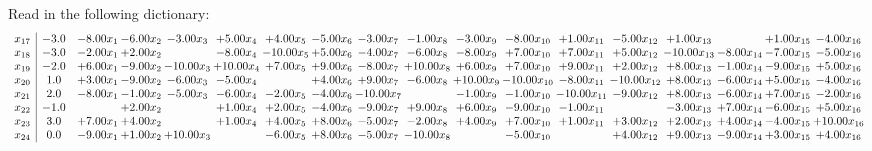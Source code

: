 \documentclass[9pt]{article}
\begin{document}
Read in the following dictionary:
\[\begin{array}{c| c c@{\hskip 2pt} c@{\hskip 2pt} c@{\hskip 2pt} c@{\hskip 2pt} c@{\hskip 2pt} c@{\hskip 2pt} c@{\hskip 2pt} c@{\hskip 2pt} c@{\hskip 2pt} c@{\hskip 2pt} c@{\hskip 2pt} c@{\hskip 2pt} c@{\hskip 2pt} c@{\hskip 2pt} c@{\hskip 2pt} c@{\hskip 2pt} }
 x_{17}   &  -3.0 & -8.00 x_{1} & -6.00 x_{2} & -3.00 x_{3} & +  5.00 x_{4} & +  4.00 x_{5} & -5.00 x_{6} & -3.00 x_{7} & -1.00 x_{8} & -3.00 x_{9} & -8.00 x_{10} & +  1.00 x_{11} & -5.00 x_{12} & +  1.00 x_{13} &   & +  1.00 x_{15} & -4.00 x_{16}\\
 x_{18}   &  -3.0 & -2.00 x_{1} & +  2.00 x_{2} &   & -8.00 x_{4} & -10.00 x_{5} & +  5.00 x_{6} & -4.00 x_{7} & -6.00 x_{8} & -8.00 x_{9} & +  7.00 x_{10} & +  7.00 x_{11} & +  5.00 x_{12} & -10.00 x_{13} & -8.00 x_{14} & -7.00 x_{15} & -5.00 x_{16}\\
 x_{19}   &  -2.0 & +  6.00 x_{1} & -9.00 x_{2} & -10.00 x_{3} & + 10.00 x_{4} & +  7.00 x_{5} & +  9.00 x_{6} & -8.00 x_{7} & + 10.00 x_{8} & +  6.00 x_{9} & +  7.00 x_{10} & +  9.00 x_{11} & +  2.00 x_{12} & +  8.00 x_{13} & -1.00 x_{14} & -9.00 x_{15} & +  5.00 x_{16}\\
 x_{20}   &  1.0 & +  3.00 x_{1} & -9.00 x_{2} & -6.00 x_{3} & -5.00 x_{4} &   & +  4.00 x_{6} & +  9.00 x_{7} & -6.00 x_{8} & + 10.00 x_{9} & -10.00 x_{10} & -8.00 x_{11} & -10.00 x_{12} & +  8.00 x_{13} & -6.00 x_{14} & +  5.00 x_{15} & -4.00 x_{16}\\
 x_{21}   &  2.0 & -8.00 x_{1} & -1.00 x_{2} & -5.00 x_{3} & -6.00 x_{4} & -2.00 x_{5} & -4.00 x_{6} & -10.00 x_{7} &   & -1.00 x_{9} & -1.00 x_{10} & -10.00 x_{11} & -9.00 x_{12} & +  8.00 x_{13} & -6.00 x_{14} & +  7.00 x_{15} & -2.00 x_{16}\\
 x_{22}   &  -1.0  &   & +  2.00 x_{2} &   & +  1.00 x_{4} & +  2.00 x_{5} & -4.00 x_{6} & -9.00 x_{7} & +  9.00 x_{8} & +  6.00 x_{9} & -9.00 x_{10} & -1.00 x_{11} &   & -3.00 x_{13} & +  7.00 x_{14} & -6.00 x_{15} & +  5.00 x_{16}\\
 x_{23}   &  3.0 & +  7.00 x_{1} & +  4.00 x_{2} &   & +  1.00 x_{4} & +  4.00 x_{5} & +  8.00 x_{6} & -5.00 x_{7} & -2.00 x_{8} & +  4.00 x_{9} & +  7.00 x_{10} & +  1.00 x_{11} & +  3.00 x_{12} & +  2.00 x_{13} & +  4.00 x_{14} & -4.00 x_{15} & + 10.00 x_{16}\\
 x_{24}   &  0.0 & -9.00 x_{1} & +  1.00 x_{2} & + 10.00 x_{3} &   & -6.00 x_{5} & +  8.00 x_{6} & -5.00 x_{7} & -10.00 x_{8} &   & -5.00 x_{10} &   & +  4.00 x_{12} & +  9.00 x_{13} & -9.00 x_{14} & +  3.00 x_{15} & +  4.00 x_{16}\\

\end{array}\]
\end{document}
